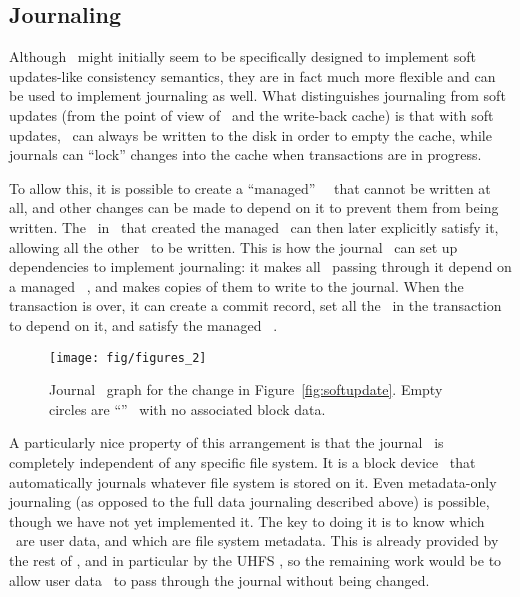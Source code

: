 \subsection{Journaling}
\label{sec:consistency:journal}

Although \chdescs\ might initially seem to be specifically designed to
implement soft updates-like consistency semantics, they are in fact much more
flexible and can be used to implement journaling as well. What distinguishes
journaling from soft updates (from the point of view of \chdescs\ and
the write-back cache) is that with soft updates, \chdescs\ can always
be written to the disk in order to empty the cache, while journals can
``lock'' changes into the cache when transactions are in progress.

To allow this, it is possible to create a ``managed'' \noop\ \chdesc\ that
cannot be written at all, and other changes can be made to depend on it to
prevent them from being written. The \module\ in \Kudos\ that created the
managed \chdesc\ can then later explicitly satisfy it, allowing all the other
\chdescs\ to be written. This is how the journal \module\ can set up
dependencies to implement journaling: it makes all \chdescs\ passing through it
depend on a managed \noop\ \chdesc, and makes copies of them to write to the
journal. When the transaction is over, it can create a commit record, set all
the \chdescs\ in the transaction to depend on it, and satisfy the managed \noop\
\chdesc.

\begin{figure}
  \centering
  \texttt{[image: fig/figures\_2]}
  \caption{\label{fig:journal} Journal \chdesc\ graph for the
    change in Figure~\ref{fig:softupdate}. Empty circles are
    ``\noop'' \chdescs\ with no associated block data.}
\end{figure}

A particularly nice property of this arrangement is that the journal \module\
is completely independent of any specific file system. It is a block device
\module\ that automatically journals whatever file system is stored on it. Even
metadata-only journaling (as opposed to the full data journaling described
above) is possible, though we have not yet implemented it. The key to doing it
is to know which \chdescs\ are user data, and which are file system metadata.
This is already provided by the rest of \Kudos, and in particular by the UHFS
\module, so the remaining work would be to allow user data \chdescs\ to pass
through the journal without being changed.
